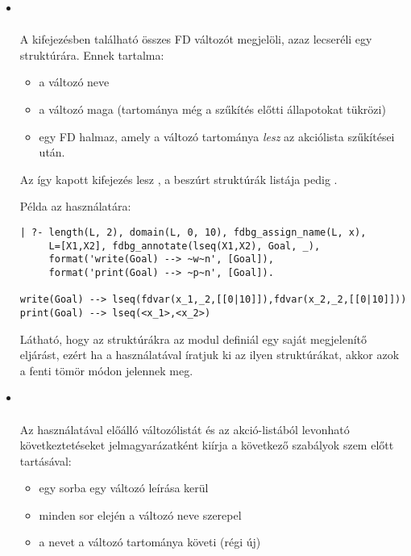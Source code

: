 \begin{itemize}
\item {} \\
   \\
  A  kifejezésben található összes FD változót megjelöli,
  azaz lecseréli egy  struktúrára.  Ennek tartalma:
  \begin{itemize}
  \item a változó neve
  \item a változó maga (tartománya még a szűkítés előtti állapotokat
    tükrözi)
  \item egy FD halmaz, amely a változó tartománya \emph{lesz} az
     akciólista szűkítései után.
  \end{itemize}
  Az így kapott kifejezés lesz , a beszúrt 
  struktúrák listája pedig .

Példa az  használatára:

\begin{verbatim}
| ?- length(L, 2), domain(L, 0, 10), fdbg_assign_name(L, x), 
     L=[X1,X2], fdbg_annotate(lseq(X1,X2), Goal, _), 
     format('write(Goal) --> ~w~n', [Goal]),
     format('print(Goal) --> ~p~n', [Goal]).

write(Goal) --> lseq(fdvar(x_1,_2,[[0|10]]),fdvar(x_2,_2,[[0|10]]))
print(Goal) --> lseq(<x_1>,<x_2>)
\end{verbatim}

Látható, hogy az  struktúrákra az \fdbg modul definiál egy saját
 megjelenítő eljárást, ezért ha a  használatával
íratjuk ki az ilyen struktúrákat, akkor azok a fenti tömör módon jelennek meg.

\item {} \\
    \\
  Az  használatával előálló  változólistát
  és az  akció-listából levonható következtetéseket jelmagyarázatként
  kiírja a következő szabályok szem előtt tartásával:
  \begin{itemize}
  \item egy sorba egy változó leírása kerül
  \item minden sor elején a változó neve szerepel
  \item a nevet a változó tartománya követi (régi \cd{->} új)
  \end{itemize}

\end{itemize}

